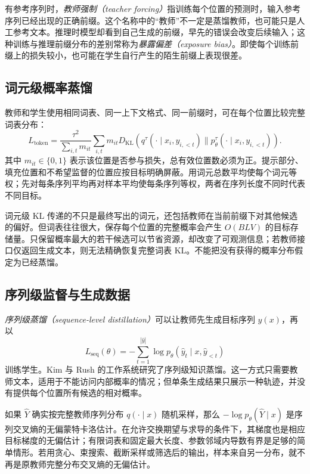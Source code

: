 \documentclass[UTF8,12pt,a4paper,fontset=fandol]{ctexart}
\begin{document}
有参考序列时，\emph{教师强制（teacher forcing）}指训练每个位置的预测时，输入参考序列已经出现的正确前缀。这个名称中的“教师”不一定是蒸馏教师，也可能只是人工参考文本。推理时模型却看到自己生成的前缀，早先的错误会改变后续输入；这种训练与推理前缀分布的差别常称为\emph{暴露偏差（exposure bias）}。即使每个训练前缀上的损失较小，也可能在学生自行产生的陌生前缀上表现很差。

\subsection{词元级概率蒸馏}
教师和学生使用相同词表、同一上下文格式、同一前缀时，可在每个位置比较完整词表分布：
\begin{equation}
 L_{\mathrm{token}}=\frac{\tau^2}{\sum_{i,t}m_{it}}
 \sum_{i,t}m_{it}D_{\mathrm{KL}}\left(
 q^\tau(\cdot\mid x_i,y_{i,<t})\|
 p_\theta^\tau(\cdot\mid x_i,y_{i,<t})\right).
 \label{eq:kd-token-loss}
\end{equation}
其中 $m_{it}\in\{0,1\}$ 表示该位置是否参与损失，总有效位置数必须为正。提示部分、填充位置和不希望监督的位置应按目标明确屏蔽。用词元总数平均使每个词元等权；先对每条序列平均再对样本平均使每条序列等权，两者在序列长度不同时代表不同目标。

词元级 KL 传递的不只是最终写出的词元，还包括教师在当前前缀下对其他候选的偏好。但词表往往很大，保存每个位置的完整概率会产生 $O(BLV)$ 的目标存储量。只保留概率最大的若干候选可以节省资源，却改变了可观测信息；若教师接口仅返回生成文本，则无法精确恢复完整词表 KL。不能把没有获得的概率分布假定为已经蒸馏。

\subsection{序列级监督与生成数据}
\emph{序列级蒸馏（sequence-level distillation）}可以让教师先生成目标序列 $\widehat y(x)$，再以
\begin{equation}
 L_{\mathrm{seq}}(\theta)=-\sum_{t=1}^{|\widehat y|}
 \log p_\theta(\widehat y_t\mid x,\widehat y_{<t})
 \label{eq:kd-sequence-loss}
\end{equation}
训练学生。Kim 与 Rush 的工作系统研究了序列级知识蒸馏\cite{kim2016}。这一方式只需要教师文本，适用于不能访问内部概率的情况；但单条生成结果只展示一种轨迹，并没有提供每个位置所有候选的相对概率。

如果 $\widehat Y$ 确实按完整教师序列分布 $q(\cdot\mid x)$ 随机采样，那么 $-\log p_\theta(\widehat Y\mid x)$ 是序列交叉熵的无偏蒙特卡洛估计。在允许交换期望与求导的条件下，其梯度也是相应目标梯度的无偏估计；有限词表和固定最大长度、参数邻域内导数有界是足够的简单情形。若用贪心、束搜索、截断采样或筛选后的输出，样本来自另一分布，就不再是原教师完整分布交叉熵的无偏估计。
\end{document}

